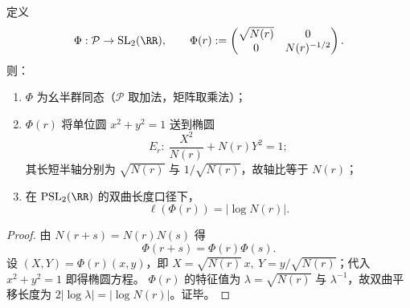 \begin{proposition}\label{prop:conclusion-prime-register-elliptic-representation}
定义
\[
\Phi:\mathcal P\to \mathrm{SL}_2(\RR),\qquad
\Phi(r):=
\begin{pmatrix}
\sqrt{N(r)}&0\\
0&N(r)^{-1/2}
\end{pmatrix}.
\]
则：
\begin{enumerate}
  \item \(\Phi\) 为幺半群同态（\(\mathcal P\) 取加法，矩阵取乘法）；
  \item \(\Phi(r)\) 将单位圆 \(x^2+y^2=1\) 送到椭圆
  \[
  E_r:\ \frac{X^2}{N(r)}+N(r)Y^2=1;
  \]
  其长短半轴分别为 \(\sqrt{N(r)}\) 与 \(1/\sqrt{N(r)}\)，故轴比等于 \(N(r)\)；
  \item 在 \(\mathrm{PSL}_2(\RR)\) 的双曲长度口径下，
  \[
  \ell(\Phi(r))=\bigl|\log N(r)\bigr|.
  \]
\end{enumerate}
\end{proposition}
\begin{proof}
由 \(N(r+s)=N(r)N(s)\) 得
\[
\Phi(r+s)=\Phi(r)\Phi(s).
\]
设 \((X,Y)=\Phi(r)(x,y)\)，即 \(X=\sqrt{N(r)}\,x,\ Y=y/\sqrt{N(r)}\)；代入 \(x^2+y^2=1\) 即得椭圆方程。
\(\Phi(r)\) 的特征值为 \(\lambda=\sqrt{N(r)}\) 与 \(\lambda^{-1}\)，故双曲平移长度为 \(2|\log\lambda|=|\log N(r)|\)。证毕。
\end{proof}



